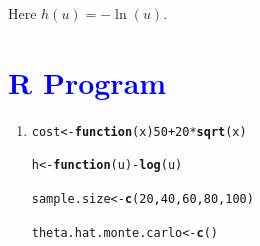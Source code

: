 \documentclass[11pt, a4paper]{article}\usepackage[]{graphicx}\usepackage[]{xcolor}
\makeatletter
\newcommand{\hlnum}[1]{\textcolor[rgb]{0.686,0.059,0.569}{#1}}%
\newcommand{\hlopt}[1]{\textcolor[rgb]{0,0,0}{#1}}%
\newcommand{\hldef}[1]{\textcolor[rgb]{0.345,0.345,0.345}{#1}}%
\newcommand{\hlkwa}[1]{\textcolor[rgb]{0.161,0.373,0.58}{\textbf{#1}}}%
\newcommand{\hlkwb}[1]{\textcolor[rgb]{0.69,0.353,0.396}{#1}}%
\newcommand{\hlkwc}[1]{\textcolor[rgb]{0.333,0.667,0.333}{#1}}%
\newcommand{\hlkwd}[1]{\textcolor[rgb]{0.737,0.353,0.396}{\textbf{#1}}}%
\newenvironment{kframe}{%
 \def\at@end@of@kframe{}%
 \ifinner\ifhmode%
  \def\at@end@of@kframe{\end{minipage}}%
  \begin{minipage}{\columnwidth}%
 \fi\fi%
 \def\FrameCommand##1{\hskip\@totalleftmargin \hskip-\fboxsep
 \colorbox{shadecolor}{##1}\hskip-\fboxsep
     \hskip-\linewidth \hskip-\@totalleftmargin \hskip\columnwidth}%
 \MakeFramed {\advance\hsize-\width
   \@totalleftmargin\z@ \linewidth\hsize
   \@setminipage}}%
 {\par\unskip\endMakeFramed%
 \at@end@of@kframe}
\newenvironment{knitrout}{}{} %
\makeatother
\begin{document}
Here $h(u) = - \ln(u)$.

\newpage

\section*{\faArrowAltCircleRight[regular] \textcolor{blue}{R Program}}





\begin{enumerate}

\item[\scalebox{2.0}{\twemoji{keycap: 1}}] 

\begin{knitrout}
\color{fgcolor}\begin{kframe}
\begin{alltt}
\hldef{cost} \hlkwb{<-} \hlkwa{function}\hldef{(}\hlkwc{x}\hldef{)} \hlnum{50} \hlopt{+} \hlnum{20} \hlopt{*} \hlkwd{sqrt}\hldef{(x)}
\end{alltt}
\end{kframe}
\end{knitrout}

\begin{knitrout}
\color{fgcolor}\begin{kframe}
\begin{alltt}
\hldef{h} \hlkwb{<-} \hlkwa{function}\hldef{(}\hlkwc{u}\hldef{)} \hlopt{-} \hlkwd{log}\hldef{(u)}
\end{alltt}
\end{kframe}
\end{knitrout}

\begin{knitrout}
\color{fgcolor}\begin{kframe}
\begin{alltt}
\hldef{sample.size} \hlkwb{<-} \hlkwd{c}\hldef{(}\hlnum{20}\hldef{,} \hlnum{40}\hldef{,} \hlnum{60}\hldef{,} \hlnum{80}\hldef{,} \hlnum{100}\hldef{)}
\end{alltt}
\end{kframe}
\end{knitrout}

\begin{knitrout}
\color{fgcolor}\begin{kframe}
\begin{alltt}
\hldef{theta.hat.monte.carlo} \hlkwb{<-} \hlkwd{c}\hldef{()}


\end{alltt}
\end{kframe}
\end{knitrout}
\end{enumerate}
\end{document}
